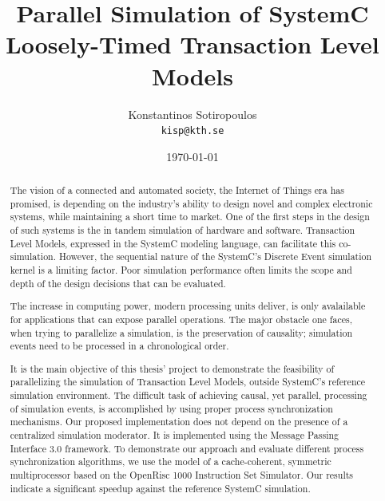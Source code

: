 \documentclass[12pt,twoside]{article}
\author{Konstantinos Sotiropoulos \\ \texttt{kisp@kth.se}}
\date{\today}
\title{Parallel Simulation of SystemC Loosely-Timed Transaction Level Models}
\begin{document}
\maketitle
\clearpage



\begin{abstract}
The vision of a connected and automated society, the Internet of Things era has promised,
is depending on the industry's ability to design novel and complex electronic systems,
while maintaining a short time to market.
One of the first steps in the design of such systems is the in tandem simulation of hardware and software.
Transaction Level Models, expressed in the SystemC modeling language, can facilitate this co-simulation.
However, the sequential nature of the SystemC's Discrete Event simulation kernel is a limiting factor.
Poor simulation performance often limits the scope and depth of the design decisions that can be evaluated.

The increase in computing power, modern processing units deliver, is only avalailable for applications that can expose parallel operations.
The major obstacle one faces, when trying to parallelize a simulation, is the preservation of causality; simulation events need to be processed in a chronological order.

It is the main objective of this thesis' project to demonstrate the feasibility of parallelizing the simulation of Transaction Level Models, outside SystemC's reference simulation environment.
The difficult task of achieving causal, yet parallel, processing of simulation events, is accomplished by using proper process synchronization mechanisms.
Our proposed implementation does not depend on the presence of a centralized simulation moderator. 
It is implemented using the Message Passing Interface 3.0 framework.
To demonstrate our approach and evaluate different process synchronization algorithms,
we use the model of a cache-coherent, symmetric multiprocessor based on the OpenRisc 1000 Instruction Set Simulator. Our results indicate a significant speedup against the reference SystemC simulation.


\end{abstract}



\tableofcontents
\clearpage
\end{document}
